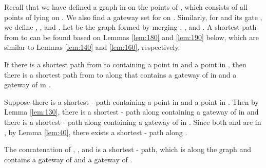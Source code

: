 \documentclass[english,runningheads,11pt]{llncs}
\newenvironment{proof}{\noindent {\textbf{Proof:}}\rm}{\hfill \rm}
\begin{document}
Recall that we have defined a graph  in  on the points of
, which consists of all points of  lying on . We
also find a gateway set  for  on . Similarly,
for  and its gate , we define , , and
. Let  be the graph formed by merging
, , and .
A shortest path from  to  can be found based on Lemmas \ref{lem:180} and \ref{lem:190}
below, which are similar to Lemmas \ref{lem:140} and \ref{lem:160}, respectively.

\begin{lemma}\label{lem:180}
If there is a shortest path from  to  containing a point in  and a point in ,
then there is a shortest path from  to  along  that contains
a gateway of  in  and a gateway of  in
.
\end{lemma}
\begin{proof}
Suppose there is a shortest - path containing a point  in  and a point  in .
Then by Lemma \ref{lem:130}, there is a shortest - path  along 
containing a gateway of  in  and there is a shortest -
path  along  containing a gateway of  in .
Since both  and  are in , by Lemma \ref{lem:40}, there exists a shortest
- path  along .

The concatenation of , , and  is a shortest - path,
which is along the graph  and contains a gateway of  and a gateway of .
\end{proof}
\end{document}
